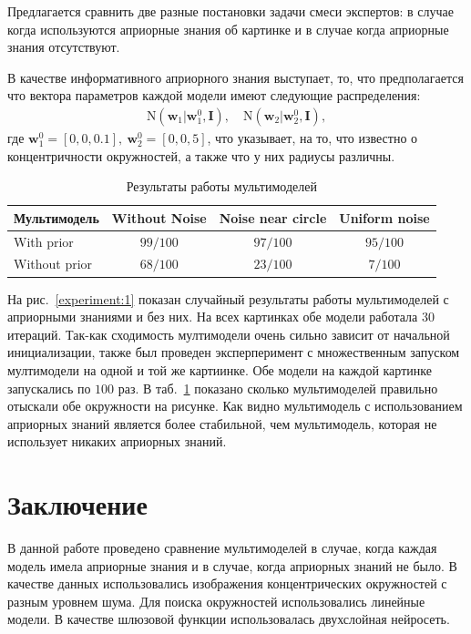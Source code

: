 \documentclass[12pt, twoside]{article}
\numberwithin{equation}{section}
\begin{document}
Предлагается сравнить две разные постановки задачи смеси экспертов: в случае когда используются априорные знания об картинке и в случае когда априорные знания отсутствуют.

В качестве информативного априорного знания выступает, то, что предполагается что вектора параметров каждой модели имеют следующие распределения:
\begin{equation}
\label{eq:ce:1}
\begin{aligned}
\text{N}\left(\textbf{w}_1|\textbf{w}^{0}_{1}, \textbf{I}\right), \quad \text{N}\left(\textbf{w}_2|\textbf{w}^{0}_{2}, \textbf{I}\right),
\end{aligned}
\end{equation}
где $\textbf{w}^{0}_1 = [0, 0, 0.1],\ \textbf{w}^{0}_2 = [0, 0, 5]$, что указывает, на то, что известно о концентричности окружностей, а также что у них радиусы различны.

\begin{table}[h!t]
\begin{center}
\caption{Результаты работы мультимоделей}
\label{tb:ce:1}
\begin{tabular}{|c|c|c|c|}
\hline
	Мультимодель & Without Noise& Noise near circle& Uniform noise\\
	\hline
	\multicolumn{1}{|l|}{With prior}
	& $99/100$& $97/100$& $95/100$\\
	\hline
	\multicolumn{1}{|l|}{Without prior}
	& $68/100$& $23/100$& $7/100$\\
\hline

\end{tabular}
\end{center}
\end{table}

На рис.~\ref{experiment:1} показан случайный результаты работы мультимоделей с априорными знаниями и без них. На всех картинках обе модели работала $30$ итераций. Так-как сходимость мултимодели очень сильно зависит от начальной инициализации, также был проведен эксперперимент с множественным запуском мултимодели на одной и той же картиинке. Обе модели на каждой картинке запускались по $100$ раз. В таб.~\ref{tb:ce:1} показано сколько мультимоделей правильно отыскали обе окружности на рисунке. Как видно мультимодель с использованием априорных знаний является более стабильной, чем мультимодель, которая не использует никаких априорных знаний.



\section{Заключение}
В данной работе проведено сравнение мультимоделей в случае, когда каждая модель имела априорные знания и в случае, когда априорных знаний не было. В качестве данных использовались изображения концентрических окружностей с разным уровнем шума. Для поиска окружностей использовались линейные модели. В качестве шлюзовой функции использовалась двухслойная нейросеть.
\end{document}
